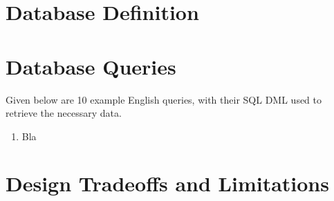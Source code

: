 \documentclass[11pt]{report}
\begin{document}
\section{Database Definition}

\section{Database Queries}
Given below are 10 example English queries, with their SQL DML used to retrieve the necessary data.
\begin{enumerate}
    \item Bla
\end{enumerate}
\clearpage
\section{Design Tradeoffs and Limitations}
\end{document}
